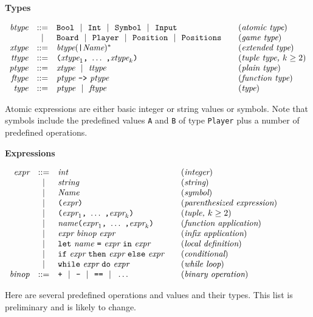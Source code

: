 \documentclass[11pt]{article}
\makeatletter
\newcommand{\prodName}[1]{&(\emph{#1})\\}
\newcommand{\nt}[1]{\textit{#1}}
\newcommand{\prog}[1]{\texttt{#1}}
\newcommand{\ORil}{\ \ |\ \ }
\newcommand{\IS}{&::=&}
\newcommand{\OR}{&|&}
\newcommand{\syntax}[2]{
  \needspace{3\baselineskip}
  \bigskip\par\noindent\textbf{#1}\par\smallskip%
  $\begin{array}{rcl@{\qquad}l}#2\end{array}$%
  \par\bigskip\noindent\ignorespaces
}
\newcommand{\lp}{\prog{(}}
\newcommand{\rp}{\prog{)}}
\newcommand{\paren}[1]{\lp#1\rp}
\makeatother
\begin{document}
\syntax{Types}{
\nt{btype}    \IS  \prog{Bool} \ORil \prog{Int} \ORil
                   \prog{Symbol} \ORil \prog{Input}
                                                         \prodName{atomic type}
              \OR  \prog{Board} \ORil \prog{Player} \ORil
                   \prog{Position} \ORil \prog{Positions}
                                                           \prodName{game type}
\nt{xtype}    \IS  \nt{btype}(\prog{|}\nt{Name})^*
                                                       \prodName{extended type}
\nt{ttype}    \IS  \paren{\nt{xtype}_1\prog{,}\ \ldots\ \prog{,}\nt{xtype}_k}
                                               \prodName{tuple type, $k\geq 2$}
\nt{ptype}     \IS  \nt{xtype} \ORil \nt{ttype}
                                                          \prodName{plain type}
\nt{ftype}    \IS  \nt{ptype}\ \prog{->}\ \nt{ptype}   \prodName{function type}
\nt{type}     \IS  \nt{ptype} \ORil \nt{ftype}
                                                                \prodName{type}
}
%
Atomic expressions are either basic integer or string values or symbols. Note
that symbols include the predefined values \prog{A} and \prog{B} of type
\prog{Player} plus a number of predefined operations.

\syntax{Expressions}{
\nt{expr}     \IS  \nt{int}                                 \prodName{integer}
              \OR  \nt{string}                               \prodName{string}
              \OR  \nt{Name}                                 \prodName{symbol}
              \OR  \paren{\nt{expr}}       \prodName{parenthesized expression}
              \OR  \paren{\nt{expr}_1\prog{,}\ \ldots\ \prog{,}\nt{expr}_k}
                                                    \prodName{tuple, $k\geq 2$}
              \OR  \nt{name}\paren{\nt{expr}_1\prog{,}\ \ldots\
                                              \prog{,}\nt{expr}_k}
                                               \prodName{function application}
              \OR  \nt{expr}\ \nt{binop}\ \nt{expr}
                                                  \prodName{infix application}
             \OR  \prog{let}\ \nt{name}\ \prog{=}\ \nt{expr}\
                   \prog{in}\ \nt{expr}            \prodName{local definition}
              \OR  \prog{if}\ \nt{expr}\ \prog{then}\ \nt{expr}\
                   \prog{else}\ \nt{expr}               \prodName{conditional}
              \OR  \prog{while}\ \nt{expr}\ \prog{do}\ \nt{expr}
                                                         \prodName{while loop}
%
\nt{binop}    \IS  \prog{+} \ORil \prog{-} \ORil \prog{==} \ORil \ldots
                                                   \prodName{binary operation}
}
%
%
%
Here are several predefined operations and values and their types. This list is preliminary and is likely to change.
\end{document}
